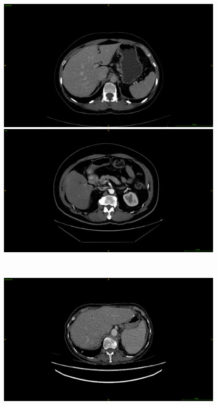 {\begin{figure}[!ht]
	\begin{mdframed}[backgroundcolor=blue!50,linecolor=blue!50]
		\centering
		\begin{minipage}{6cm}
			\includegraphics[width=\linewidth]{images/Artifacts/LITS_pat58_potentialCyst}
		\end{minipage} \hspace{-0.1cm}
		\begin{minipage}{6cm}
			\includegraphics[width=\linewidth]{images/Artifacts/TCIA_TCGA_DD_A1EA_presenceOfCyst}
		\end{minipage} \\
		\begin{minipage}{6cm}
			\includegraphics[width=\linewidth]{images/Artifacts/LITS_pat104_fatAccumulation}

\end{minipage}
\end{mdframed}
\end{figure}}
